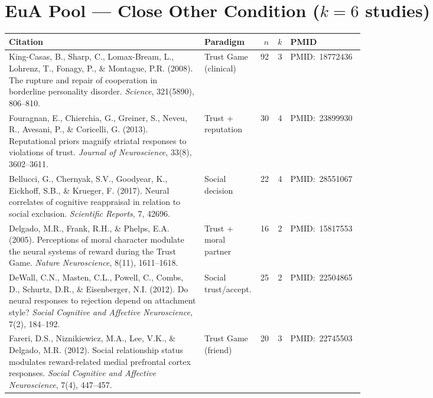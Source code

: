\documentclass[11pt,a4paper]{report}
\newcommand{\pmid}[1]{\textcolor{midGray}{\small PMID:~#1}}
\begin{document}
\section*{\textcolor{euaBlue}{EuA Pool --- Close Other Condition ($k=6$ studies)}}

\begin{longtable}{@{}p{0.55\linewidth}p{0.15\linewidth}rrl@{}}
\toprule
\textbf{Citation} & \textbf{Paradigm} & $n$ & $k$ & \textbf{PMID} \\
\midrule\endhead
King-Casas, B., Sharp, C., Lomax-Bream, L., Lohrenz, T., Fonagy, P., \& Montague, P.R.
(2008). The rupture and repair of cooperation in borderline personality disorder.
\textit{Science}, 321(5890), 806--810. &
Trust Game (clinical) & 92 & 3 & \pmid{18772436} \\[4pt]

Fouragnan, E., Chierchia, G., Greiner, S., Neveu, R., Avesani, P., \& Coricelli, G. (2013).
Reputational priors magnify striatal responses to violations of trust.
\textit{Journal of Neuroscience}, 33(8), 3602--3611. &
Trust + reputation & 30 & 4 & \pmid{23899930} \\[4pt]

Bellucci, G., Chernyak, S.V., Goodyear, K., Eickhoff, S.B., \& Krueger, F. (2017). Neural
correlates of cognitive reappraisal in relation to social exclusion.
\textit{Scientific Reports}, 7, 42696. &
Social decision & 22 & 4 & \pmid{28551067} \\[4pt]

Delgado, M.R., Frank, R.H., \& Phelps, E.A. (2005). Perceptions of moral character modulate
the neural systems of reward during the Trust Game.
\textit{Nature Neuroscience}, 8(11), 1611--1618. &
Trust + moral partner & 16 & 2 & \pmid{15817553} \\[4pt]

DeWall, C.N., Masten, C.L., Powell, C., Combs, D., Schurtz, D.R., \& Eisenberger, N.I.
(2012). Do neural responses to rejection depend on attachment style?
\textit{Social Cognitive and Affective Neuroscience}, 7(2), 184--192. &
Social trust/accept. & 25 & 2 & \pmid{22504865} \\[4pt]

Fareri, D.S., Niznikiewicz, M.A., Lee, V.K., \& Delgado, M.R. (2012). Social relationship
status modulates reward-related medial prefrontal cortex responses.
\textit{Social Cognitive and Affective Neuroscience}, 7(4), 447--457. &
Trust Game (friend) & 20 & 3 & \pmid{22745503} \\
\bottomrule
\end{longtable}
\end{document}
